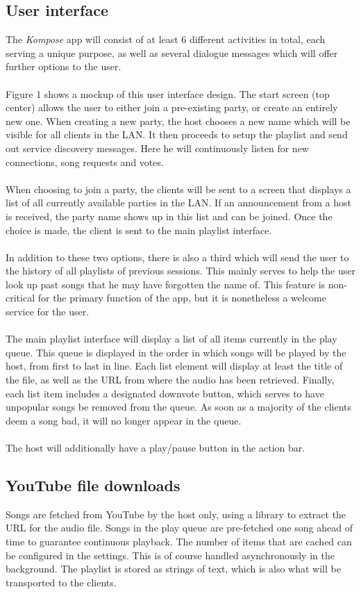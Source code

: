 \documentclass{report}
\begin{document}
\subsection{User interface}
The \emph{Kompose} app will consist of at least 6 different activities in total, 
each serving a unique purpose, as well as several dialogue messages which will offer 
further options to the user. \\\\
%
Figure 1 shows a mockup of this user interface design. The start screen
(top center) allows the user to either join a pre-existing party, or 
create an entirely new one. When creating a new party, the host chooses 
a new name which will be visible for all clients in the LAN. It then
proceeds to setup the playlist and send out service discovery messages. 
Here he will continuously listen for new connections, song requests and votes. \\\\
%
When choosing to join a party, the clients will be sent to a screen
that displays a list of all currently available parties in the LAN. 
If an announcement from a host is received, the party name shows up in 
this list and can be joined. Once the choice is made, the client is sent
to the main playlist interface. \\\\
%
In addition to these two options, there is also a third which will send 
the user to the history of all playlists of previous sessions. This mainly 
serves to help the user look up past songs that he may have forgotten the name of.
This feature is non-critical for the primary function of the app, but it 
is nonetheless a welcome service for the user. \\\\
%
The main playlist interface will display a list of all items currently in 
the play queue. This queue is displayed in the order in which songs will be 
played by the host, from first to last in line. Each list element will display 
at least the title of the file, as well as the URL from where the audio has 
been retrieved. Finally, each list item includes a designated downvote button,
which serves to have unpopular songs be removed from the queue. As soon as 
a majority of the clients deem a song bad, it will no longer appear in the queue. \\\\
%
The host will additionally have a play/pause button in the action bar.

\subsection{YouTube file downloads}
Songs are fetched from YouTube by the host only, using a library \cite{youtubeExtractor}
to extract the URL for the audio file. Songs in the play queue are pre-fetched
one song ahead of time to guarantee continuous playback. The number of items that 
are cached can be configured in the settings. This is of course handled asynchronously in
the background. The playlist is stored as strings of text, which is also what will be 
transported to the clients.
\end{document}

